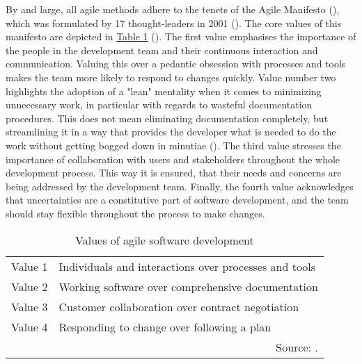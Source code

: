 By and large, all agile methods adhere to the tenets of the Agile Manifesto (\cite*{AgileManifesto2001}), which was formulated by 17 thought-leaders in 2001 (\cite{Rigby2016a}). The core values of this manifesto are depicted in \hyperref[tab: Values of agile software development]{Table 1} (\cite{Dingsoyr2012}). The first value emphasises the importance of the people in the development team and their continuous interaction and communication. Valuing this over a pedantic obsession with processes and tools makes the team more likely to respond to changes quickly. Value number two highlights the adoption of a "lean" mentality when it comes to minimizing unnecessary work, in particular with regards to wasteful documentation procedures. This does not mean eliminating documentation completely, but streamlining it in a way that provides the developer what is needed to do the work without getting bogged down in minutiae (\cite{Eby2016}). The third value stresses the importance of collaboration with users and stakeholders throughout the whole development process. This way it is ensured, that their needs and concerns are being addressed by the development team. Finally, the fourth value acknowledges that uncertainties are a constitutive part of software development, and the team should stay flexible throughout the process to make changes.\par
%
\begin{table}[ht!]
	\centering
	\caption{Values of agile software development}\label{tab: Values of agile software development}
	\renewcommand{\arraystretch}{1.4}
	\begin{tabular}{ p{1.5cm} p{9cm} }
		\hline
		Value 1 & Individuals and interactions over processes and tools\\
		Value 2 & Working software over comprehensive documentation\\
		Value 3 & Customer collaboration over contract negotiation\\
		Value 4 & Responding to change over following a plan\\
		\hline
		\multicolumn{2}{r}{Source: \cite{AgileManifesto2001}.}	
	\end{tabular}
\end{table}
%

